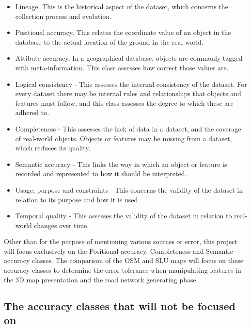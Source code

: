 \documentclass[a4paper]{article}
\begin{document}
\begin{itemize}
  \item Lineage. This is the historical aspect of the dataset, which concerns the collection process and evolution.
  \item Positional accuracy. This relates the coordinate value of an object in the database to the actual location of the ground in the real world.
  \item Attibute accuracy. In a geographical database, objects are commonly tagged with meta-information. This class assesses how correct those values are.
  \item Logical consistency - This assesses the internal consistency of the dataset. For every dataset there may be internal rules and relationships that objects and features must follow, and this class assesses the degree to which these are adhered to.
  \item Completeness - This assesses the lack of data in a dataset, and the coverage of real-world objects. Objects or features may be missing from a dataset, which reduces its quality.
  \item Semantic accuracy - This links the way in which an object or feature is recorded and represented to how it should be interpreted.
  \item Usage, purpose and constraints - This concerns the validity of the dataset in relation to its purpose and how it is used.
  \item Temporal quality - This assesses the validity of the dataset in relation to real-world changes over time.
\end{itemize}

Other than for the purpose of mentioning various sources or error, this project will focus exclusively on the Positional accuracy, Completeness and Semantic accuracy classes. The comparison of the OSM and SLU maps will focus on these accuracy classes to determine the error tolerance when manipulating features in the 3D map presentation and the road network generating phase.

\subsection{The accuracy classes that will not be focused on}
\end{document}
